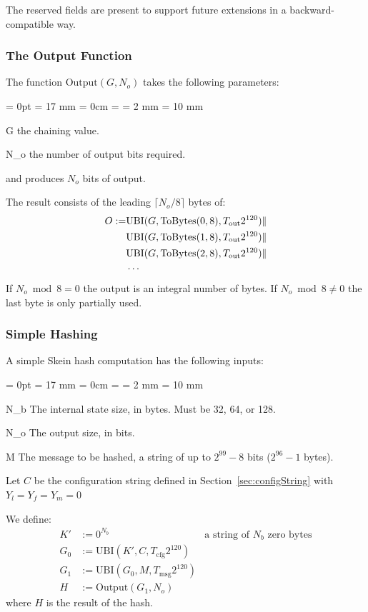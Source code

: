 \documentclass[11pt,twoside]{article}
\newcommand{\concat}{\mathbin{|\hspace{-1pt}|}}
\newcommand{\UBI}{\text{UBI}}
\newcommand{\ToBytes}{\text{ToBytes}\xspace}
\newcommand{\Output}{\text{Output}\xspace}
\newcommand{\TypeSymbol}[1]{\text{$T_\text{#1}$}\xspace}
\newcommand{\TypeConfig}{\TypeSymbol{cfg}}
\newcommand{\TypeMsg}{\TypeSymbol{msg}}
\newcommand{\TypeOut}{\TypeSymbol{out}}
\newcommand{\parameterlabel}[1]{$#1$\hfill}
\newenvironment{parameters}{\begin{list}{?}{%
\parsep = 0pt
\leftmargin = 17 mm
\rightmargin = 0cm
\listparindent = \parindent
\labelsep = 2 mm
\labelwidth = 10 mm
\let\makelabel\parameterlabel
}%
}{\end{list}}
\begin{document}
The reserved fields are present to support future extensions in a backward-compatible way.

\subsubsection{The Output Function}

The function $\Output( G, N_o )$ takes the following parameters:
\begin{parameters}
  \item[G] the chaining value.
  \item[N_o] the number of output bits required.
\end{parameters}
and produces $N_o$ bits of output.

The result consists of the leading $\lceil N_o/8 \rceil$ bytes of:
\begin{align*}
  O := &\UBI( G, \ToBytes( 0, 8 ), \TypeOut 2^{120} ) \concat \\
        &\UBI( G, \ToBytes( 1, 8), \TypeOut 2^{120} ) \concat \\
        &\UBI( G, \ToBytes( 2, 8), \TypeOut 2^{120} ) \concat \\
        &\cdots
\end{align*}
If $N_o \bmod 8 = 0$ the output is an integral number of bytes. If $N_o \bmod 8 \neq 0$ the last byte is only partially used.

\subsubsection{Simple Hashing}

A simple Skein hash computation has the following inputs:
\begin{parameters}
  \item[N_b] The internal state size, in bytes. Must be 32, 64, or 128.
  \item[N_o] The output size, in bits.
  \item[M] The message to be hashed, a string of up to $2^{99}-8$ bits ($2^{96}-1$ bytes).
\end{parameters}

Let $C$ be the configuration string defined in Section~\ref{sec:configString} with $Y_l = Y_f = Y_m = 0$

We define:
\begin{align*}
  K' &:= 0^{N_b} &\text{a string of $N_b$ zero bytes}\\
  G_0 &:= \UBI( K', C, \TypeConfig 2^{120} )\\
  G_1 &:= \UBI( G_0, M, \TypeMsg 2^{120} )\\
  H &:= \Output( G_1, N_o )
\end{align*}
where $H$ is the result of the hash.
\end{document}

